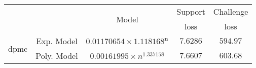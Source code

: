 \begin{tabular}{ccccc} 
\hline 
 &  & \multirow{2}{*}{Model} & Support & Challenge\tabularnewline 
 &  &  & loss  & loss\tabularnewline 
\hline 
\hline 
\multirow{2}{*}{dpmc} & Exp. Model & $\mathbf{0.01170654\times 1.118168^{n}}$ & $\mathbf{7.6286}$ & $\mathbf{594.97}$ \tabularnewline 
 & Poly. Model & $0.00161995\times n^{1.337158}$ & $7.6607$ & $603.68$ \tabularnewline 
\hline 
\end{tabular} 

